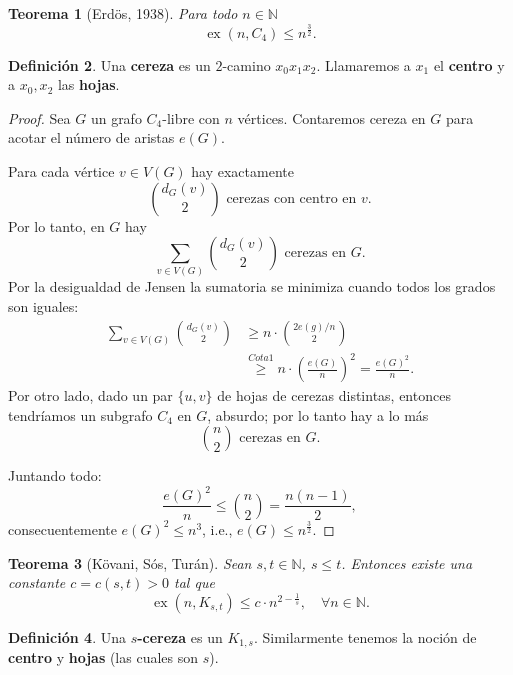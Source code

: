 \documentclass[12pt]{report}
\theoremstyle{plain}
\newtheorem{theorem}{Teorema}[section]
\theoremstyle{definition}
\newtheorem{definition}[theorem]{Definición}
\newcommand{\naturals}{\mathbb{N}}
\newcommand{\ex}[2]{\operatorname{ex} (#1, #2)}
\begin{document}
\begin{theorem}[Erdös, 1938]
Para todo $n \in \naturals$
\[
    \ex n {C_4} \leq n^{\frac 3 2}.
\]
\end{theorem}

\begin{definition}
Una \textbf{cereza} es un $2$-camino $x_0 x_1 x_2$. Llamaremos a $x_1$ el \textbf{centro} y a $x_0,x_2$ las \textbf{hojas}.
\end{definition}


\begin{proof}
Sea $G$ un grafo $C_4$-libre con $n$ vértices. Contaremos cereza en $G$ para acotar el número de aristas $e(G)$.

Para cada vértice $v \in V(G)$ hay exactamente
\[
    \binom{d_G(v)}{2} \text{ cerezas con centro en $v$}.
\]
Por lo tanto, en $G$ hay
\[
    \sum_{v \in V(G)} \binom{d_G(v)}{2} \text{ cerezas en $G$}.
\]
Por la desigualdad de Jensen la sumatoria se minimiza cuando todos los grados son iguales:
\begin{align*}
    \sum_{v \in V(G)} \binom{d_G(v)}{2} &\geq n \cdot \binom{2 e(g) / n}{2} \\
                                        &\overset{Cota 1}{\geq} n \cdot \left ( \frac{e(G)}{n} \right )^2 = \frac{e(G)^2}{n}.
\end{align*}
Por otro lado, dado un par $\{u,v\}$ de hojas de cerezas distintas, entonces tendríamos un subgrafo $C_4$ en $G$, absurdo; por lo tanto hay a lo más
\[
    \binom{n} 2 \text{ cerezas en $G$}.
\]

Juntando todo:
\[
    \frac{e(G)^2}{n} \leq \binom n 2 = \frac{n(n-1)}{2},
\]
consecuentemente $e(G)^2 \leq n^3$, i.e., $e(G) \leq n^{\frac{3}{2}}$.
\end{proof}




\begin{theorem}[Kövani, Sós, Turán]\label{th:teorema de kovani sos turan - extremalidad de Kst}
Sean $s, t \in \naturals$, $s \leq t$. Entonces existe una constante $c = c(s,t) > 0$ tal que
\[
    \ex n {K_{s,t}} \leq c \cdot n^{2 - \frac 1 s}, \quad \forall n \in \naturals.
\]
\end{theorem}

\begin{definition}
Una \textbf{$s$-cereza} es un $K_{1,s}$. Similarmente tenemos la noción de \textbf{centro} y \textbf{hojas} (las cuales son $s$).
\end{definition}
\end{document}
